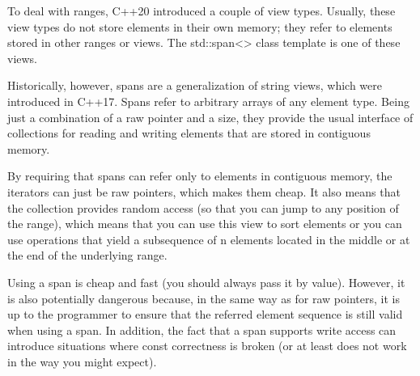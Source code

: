 To deal with ranges, C++20 introduced a couple of view types. Usually, these view types do not store elements in their own memory; they refer to elements stored in other ranges or views. The std::span<> class template is one of these views.

Historically, however, spans are a generalization of string views, which were introduced in C++17. Spans refer to arbitrary arrays of any element type. Being just a combination of a raw pointer and a size, they provide the usual interface of collections for reading and writing elements that are stored in contiguous memory.

By requiring that spans can refer only to elements in contiguous memory, the iterators can just be raw pointers, which makes them cheap. It also means that the collection provides random access (so that you can jump to any position of the range), which means that you can use this view to sort elements or you can use operations that yield a subsequence of n elements located in the middle or at the end of the underlying range.

Using a span is cheap and fast (you should always pass it by value). However, it is also potentially dangerous because, in the same way as for raw pointers, it is up to the programmer to ensure that the referred element sequence is still valid when using a span. In addition, the fact that a span supports write access can introduce situations where const correctness is broken (or at least does not work in the way you might expect).
